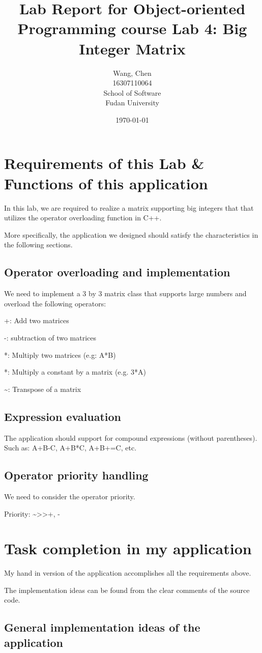 \documentclass[a4paper]{report}
\title{Lab Report for Object-oriented Programming course \newline
 Lab 4: Big Integer Matrix}
\author{Wang, Chen \\ 16307110064 \\ School of Software\\ Fudan University}
\date{\today}
\begin{document}
\maketitle

\tableofcontents

\chapter{Requirements of this Lab \& Functions of this application}
In this lab, we are required to realize a matrix supporting big integers that that utilizes the operator overloading function in C++.
\par
More specifically, the application we designed should satisfy the characteristics in the following sections.
\section{Operator overloading and implementation}
We need to implement a 3 by 3 matrix class that supports large numbers and overload the following operators:
\par
+: Add two matrices
\par
-: subtraction of two matrices
\par 
*: Multiply two matrices (e.g: A*B)
\par
*: Multiply a constant by a matrix (e.g. 3*A)
\par
\textasciitilde : Transpose of a matrix
\section{Expression evaluation}
The application should support for compound expressions (without parentheses). Such as: A+B-C, A+B*C, A+B+=C, etc.
\section{Operator priority handling}
We need to consider the operator priority.
\par
Priority: \textasciitilde \textgreater * \textgreater +, -
\chapter{Task completion in my application}
My hand in version of the application accomplishes all the requirements above.
\par
The implementation ideas can be found from the clear comments of the source code.
\section{General implementation ideas of the application}
\end{document}
